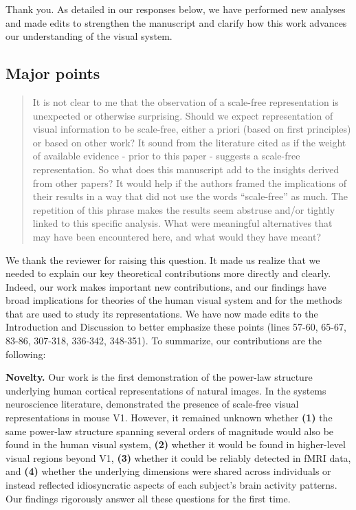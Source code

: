 \documentclass[10pt]{article}
\begin{document}
Thank you. As detailed in our responses below, we have performed new analyses and made edits to strengthen the manuscript and clarify how this work advances our understanding of the visual system.

\subsection{Major points}\label{major-points}

\begin{quote}
It is not clear to me that the observation of a scale-free representation is unexpected or otherwise surprising. Should we expect representation of visual information to be scale-free, either a priori (based on first principles) or based on other work? It sound from the literature cited as if the weight of available evidence - prior to this paper - suggests a scale-free representation. So what does this manuscript add to the insights derived from other papers? It would help if the authors framed the implications of their results in a way that did not use the words ``scale-free'' as much. The repetition of this phrase makes the results seem abstruse and/or tightly linked to this specific analysis. What were meaningful alternatives that may have been encountered here, and what would they have meant?
\end{quote}

We thank the reviewer for raising this question. It made us realize that we needed to explain our key theoretical contributions more directly and clearly. Indeed, our work makes important new contributions, and our findings have broad implications for theories of the human visual system and for the methods that are used to study its representations. We have now made edits to the Introduction and Discussion to better emphasize these points (lines 57-60, 65-67, 83-86, 307-318, 336-342, 348-351). To summarize, our contributions are the following:

\textbf{Novelty.} Our work is the first demonstration of the power-law structure underlying human cortical representations of natural images. In the systems neuroscience literature, \textcite{Stringer2019} demonstrated the presence of scale-free visual representations in mouse V1. However, it remained unknown whether \textbf{(1)} the same power-law structure spanning several orders of magnitude would also be found in the human visual system, \textbf{(2)} whether it would be found in higher-level visual regions beyond V1, \textbf{(3)} whether it could be reliably detected in fMRI data, and \textbf{(4)} whether the underlying dimensions were shared across individuals or instead reflected idiosyncratic aspects of each subject's brain activity patterns. Our findings rigorously answer all these questions for the first time.
\end{document}
